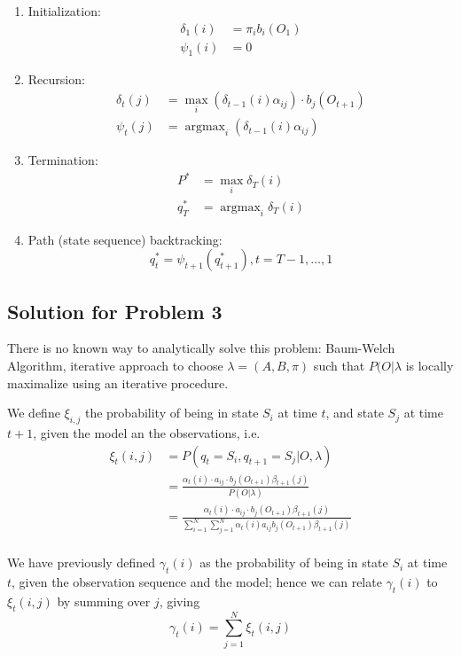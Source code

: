 \documentclass{scrartcl}
\DeclareMathOperator*{\argmax}{argmax} %
\begin{document}
\begin{appendices}
\begin{enumerate}
    \item
        Initialization:
        \begin{align*}
            \delta_1(i) &= \pi_i b_i(O_1)\\
            \psi_1(i) &= 0
        \end{align*}
    \item
        Recursion:
        \begin{align*}
            \delta_t(j) &= \max_i (\delta_{t-1}(i) \alpha_{ij}) \cdot b_j(O_{t+1})\\
            \psi_t(j) &= \argmax_i (\delta_{t-1}(i) \alpha_{ij})
        \end{align*}
    \item
        Termination:
        \begin{align*}
            P^* &= \max_i \delta_T(i)\\
            q_T^* &= \argmax_i \delta_T(i)
        \end{align*}
    \item
        Path (state sequence) backtracking:
        \[q_t^* = \psi_{t+1}(q_{t+1}^*), t = T-1, \dots, 1\]
\end{enumerate}

\subsection{Solution for Problem 3}
There is no known way to analytically solve this problem: Baum-Welch Algorithm, iterative approach to choose \(\lambda = (A, B, \pi)\) such that \(P(O|\lambda\) is locally maximalize using an iterative procedure.

We define \(\xi_{i,j}\) the probability of being in state \(S_i\) at time \(t\), and state \(S_j\) at time \(t+1\), given the model an the observations, i.e.
\begin{align*}
    \xi_{t}(i,j) &= P(q_t = S_i, q_{t+1} = S_j|O, \lambda)\\
    &= \frac{\alpha_t(i) \cdot a_{ij} \cdot b_j(O_{t+1}) \beta_{t+1}(j)}{P(O|\lambda)}\\
    &= \frac{\alpha_t(i) \cdot a_{ij} \cdot b_j(O_{t+1}) \beta_{t+1}(j)}
    {\sum_{i=1}^N \sum_{j=1}^N \alpha_t(i) a_{ij} b_j(O_{t+1}) \beta_{t+1}(j)}\\
\end{align*}

We have previously defined \(\gamma_t(i)\) as the probability of being in state \(S_i\) at time \(t\), given the observation sequence and the model; hence we can relate \(\gamma_t(i)\) to \(\xi_t(i,j)\) by summing over \(j\), giving
\[\gamma_t(i) = \sum_{j=1}^N \xi_t(i,j)\]


\end{appendices}
\end{document}

